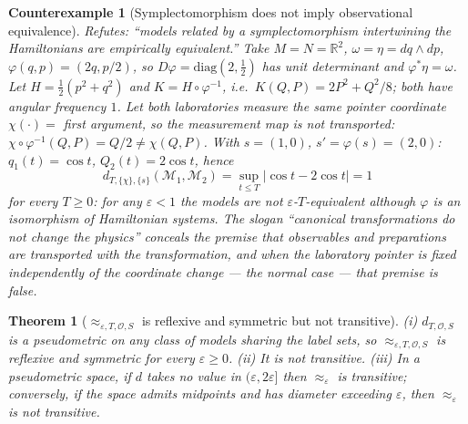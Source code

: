 \documentclass[12pt,a4paper]{article}
\theoremstyle{definition}
\theoremstyle{plain}
\newtheorem{theorem}[definition]{Theorem}
\theoremstyle{commentary}
\newtheorem{counterexample}[definition]{Counterexample}
\newcommand{\R}{\mathbb{R}}
\newcommand{\Oc}{\mathcal{O}}
\newcommand{\Mc}{\mathcal{M}}
\newcommand{\eps}{\varepsilon}
\begin{document}
\begin{counterexample}[Symplectomorphism does not imply observational equivalence]
\label{sym}
Refutes: \emph{``models related by a symplectomorphism intertwining the Hamiltonians are empirically equivalent.''}
Take $M=N=\R^2$, $\omega=\eta=dq\wedge dp$, $\varphi(q,p)=(2q,p/2)$, so $D\varphi=\mathrm{diag}(2,\tfrac12)$ has unit determinant and $\varphi^*\eta=\omega$. Let $H=\tfrac12(p^2+q^2)$ and $K=H\circ\varphi^{-1}$, i.e.\ $K(Q,P)=2P^2+Q^2/8$; both have angular frequency $1$. Let \emph{both} laboratories measure the same pointer coordinate $\chi(\cdot)=$ first argument, so the measurement map is \emph{not} transported: $\chi\circ\varphi^{-1}(Q,P)=Q/2\neq\chi(Q,P)$. With $s=(1,0)$, $s'=\varphi(s)=(2,0)$: $q_1(t)=\cos t$, $Q_2(t)=2\cos t$, hence
\[
d_{T,\{\chi\},\{s\}}(\Mc_1,\Mc_2)=\sup_{t\le T}|\cos t-2\cos t|=1
\]
for every $T\ge0$: for any $\eps<1$ the models are not $\eps$-$T$-equivalent although $\varphi$ is an isomorphism of Hamiltonian systems. The slogan ``canonical transformations do not change the physics'' conceals the premise that observables and preparations are transported with the transformation, and when the laboratory pointer is fixed independently of the coordinate change --- the normal case --- that premise is false.
\end{counterexample}

\begin{theorem}[$\approx_{\eps,T,\Oc,S}$ is reflexive and symmetric but not transitive]
\label{tol}
\emph{(i)} $d_{T,\Oc,S}$ is a pseudometric on any class of models sharing the label sets, so $\approx_{\eps,T,\Oc,S}$ is reflexive and symmetric for every $\eps\ge0$.
\emph{(ii)} It is not transitive. \emph{(iii)} In a pseudometric space, if $d$ takes no value in $(\eps,2\eps]$ then $\approx_\eps$ is transitive; conversely, if the space admits midpoints and has diameter exceeding $\eps$, then $\approx_\eps$ is not transitive.
\end{theorem}
\end{document}
